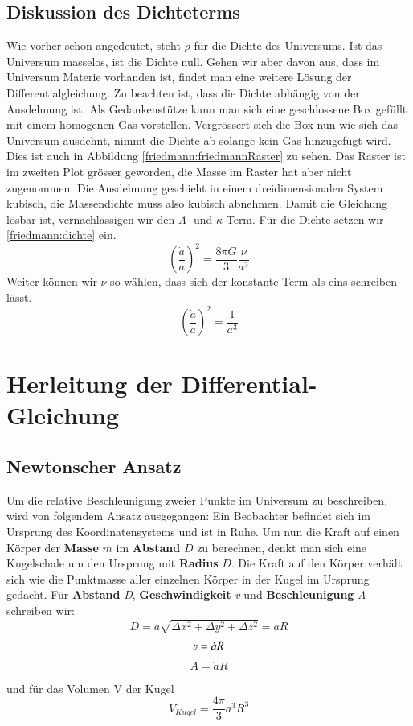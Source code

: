 \begin{refsection}
\subsection{Diskussion des Dichteterms}
Wie vorher schon angedeutet, steht $\rho$ für die Dichte des Universums. Ist das Universum masselos, ist die Dichte null. Gehen wir aber davon aus, dass im Universum Materie vorhanden ist, findet man eine weitere Lösung der Differentialgleichung. Zu beachten ist, dass die Dichte abhängig von der Ausdehnung ist. Als Gedankenstütze kann man sich eine geschlossene Box gefüllt mit einem homogenen Gas vorstellen. Vergrössert sich die Box nun wie sich das Universum ausdehnt, nimmt die Dichte ab solange kein Gas hinzugefügt wird. Dies ist auch in Abbildung \ref{friedmann:friedmannRaster} zu sehen. Das Raster ist im zweiten Plot grösser geworden, die Masse im Raster hat aber nicht zugenommen. Die Ausdehnung geschieht in einem dreidimensionalen System kubisch, die Massendichte muss also kubisch abnehmen. Damit die Gleichung lösbar ist, vernachlässigen wir den $\Lambda$- und $\kappa$-Term. Für die Dichte setzen wir \ref{friedmann:dichte} ein. 
\[\left(\frac{\dot{a}}{a}\right) ^2 = \frac{8 \pi G}{3} \frac{\nu}{a^3}\]
Weiter können wir $\nu$ so wählen, dass sich der konstante Term als eins schreiben lässt.
\[\left(\frac{\dot{a}}{a}\right) ^2 = \frac{1}{a^3}\]
\section{Herleitung der Differential-Gleichung}
\subsection{Newtonscher Ansatz}
Um die relative Beschleunigung zweier Punkte im Universum zu beschreiben, wird von folgendem Ansatz ausgegangen: Ein Beobachter befindet sich im Ursprung des Koordinatensystems und ist in Ruhe. Um nun die Kraft auf einen Körper der \textbf{Masse} $m$ im \textbf{Abstand} $D$ zu berechnen, denkt man sich eine Kugelschale um den Ursprung mit \textbf{Radius} $D$. Die Kraft auf den Körper verhält sich wie die Punktmasse aller  einzelnen Körper in der Kugel im Ursprung gedacht.
Für \textbf{Abstand} \textit{D}, \textbf{Geschwindigkeit} \textit{v} und \textbf{Beschleunigung} \textit{A} schreiben wir:
\[D =  a \sqrt{\Delta x^2 + \Delta y^2 + \Delta z^2}  = a R\]
\[\varv = \dot{a} R\]
\[A = \ddot{a} R\]

und für das Volumen V der Kugel
\[V_{Kugel} = \frac{4 \pi }{3} a^3 R^3\]


\end{refsection}
